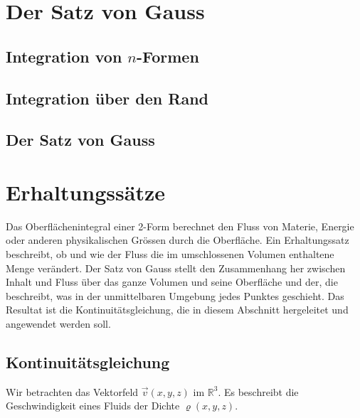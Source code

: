 \section{Der Satz von Gauss
\label{buch:gauss:section:satzvongauss}}
%

\subsection{Integration von $n$-Formen}

\subsection{Integration über den Rand}

\subsection{Der Satz von Gauss}

%
%
\section{Erhaltungssätze
\label{buch:gauss:section:erhaltungssatz}}
Das Oberflächenintegral einer 2-Form berechnet den Fluss von Materie,
Energie oder anderen physikalischen Grössen durch die Oberfläche.
Ein Erhaltungssatz beschreibt, ob und wie der Fluss die im umschlossenen
Volumen enthaltene Menge verändert.
Der Satz von Gauss stellt den Zusammenhang her zwischen Inhalt und Fluss
über das ganze Volumen und seine Oberfläche und der, die beschreibt,
was in der unmittelbaren Umgebung jedes Punktes geschieht.
Das Resultat ist die Kontinuitätsgleichung, die in diesem Abschnitt
hergeleitet und angewendet werden soll.

%
%
\subsection{Kontinuitätsgleichung}
%
Wir betrachten das Vektorfeld $\vec{v}(x,y,z)$ im $\mathbb{R}^3$.
Es beschreibt die Geschwindigkeit eines Fluids der Dichte $\varrho(x,y,z)$.

